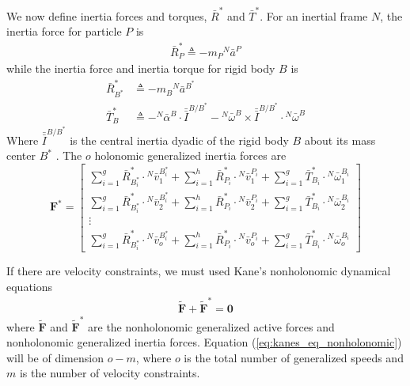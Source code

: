 \documentclass[smallcondensed,final]{svjour3}                     %
\begin{document}
We now define inertia forces and torques, $\bar{R}^*$ and $\bar{T}^*$.
For an inertial frame $N$, the inertia force for particle $P$ is
\begin{align}
\label{eq:particle_gen_inertia}
\bar{R}^*_P \triangleq -m_P {^N}\bar{a}^P
\end{align}
while the inertia force and inertia torque for rigid body $B$ is
\begin{align}
\label{eq:rb_translational_gen_inertia}
\bar{R}^*_{B^*} &\triangleq -m_B {^N}\bar{a}^{B^*} \\
\label{eq:rb_rotational_gen_inertia}
\bar{T}^*_B &\triangleq -{^N}\bar{\alpha}^B \cdot \bar{\bar{I}}^{B/B^*} -
{^N}\bar{\omega}^B \times \bar{\bar{I}}^{B/B^*} \cdot {^N}\bar{\omega}^B
\end{align}
Where $\bar{\bar{I}}^{B/B^*}$ is the central inertia dyadic of the rigid body
$B$ about its mass center $B^*$ \cite{Kane1985}. The $o$ holonomic generalized
inertia forces are
\begin{equation}
\label{eq:definition_Fstar}
\mathbf{F}^* =
\begin{bmatrix}
\displaystyle \sum_{i=1}^g \bar{R}^*_{B^*_i} \cdot {^N}\bar{v}^{B^*_i}_1 +
\sum_{i=1}^h \bar{R}^*_{P_i} \cdot {^N}\bar{v}^{P_i}_1 +
\sum_{i=1}^g \bar{T}^*_{B_i} \cdot {^N}\bar{\omega}^{B_i}_1 \\
\displaystyle \sum_{i=1}^g \bar{R}^*_{B^*_i} \cdot {^N}\bar{v}^{B^*_i}_2 +
\sum_{i=1}^h \bar{R}^*_{P_i} \cdot {^N}\bar{v}^{P_i}_2 +
\sum_{i=1}^g \bar{T}^*_{B_i} \cdot {^N}\bar{\omega}^{B_i}_2 \\
\displaystyle \vdots \\
\displaystyle \sum_{i=1}^g \bar{R}^*_{B^*_i} \cdot {^N}\bar{v}^{B^*_i}_o +
\sum_{i=1}^h \bar{R}^*_{P_i} \cdot {^N}\bar{v}^{P_i}_o +
\sum_{i=1}^g \bar{T}^*_{B_i} \cdot {^N}\bar{\omega}^{B_i}_o
\end{bmatrix}
\end{equation}

If there are velocity constraints, we must used Kane's nonholonomic dynamical
equations
\begin{align}
\label{eq:kanes_eq_nonholonomic}
\tilde{\mathbf{F}} + \tilde{\mathbf{F}}^* = \mathbf{0}
\end{align}
where $\tilde{\mathbf{F}}$ and $\tilde{\mathbf{F}}^*$ are the nonholonomic
generalized active forces and nonholonomic generalized inertia forces.  Equation
(\ref{eq:kanes_eq_nonholonomic}) will be of dimension $o - m$, where $o$ is the
total number of generalized speeds and $m$ is the number of velocity
constraints.
\end{document}
